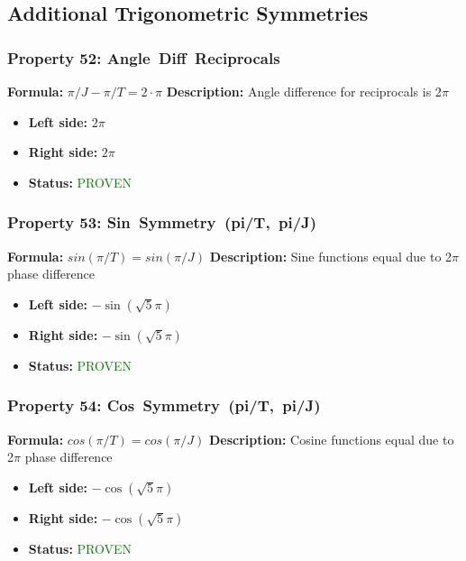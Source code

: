 \subsection{Additional Trigonometric Symmetries}

\subsubsection*{Property 52: Angle~Diff~Reciprocals}
\textbf{Formula:} $\pi/J - \pi/T = 2 \cdot \pi$
\textbf{Description:} Angle difference for reciprocals is 2$\pi$

\begin{itemize}
\item \textbf{Left side:} $2 \pi$
\item \textbf{Right side:} $2 \pi$
\item \textbf{Status:} \textcolor{green}{PROVEN}
\end{itemize}

\subsubsection*{Property 53: Sin~Symmetry~(pi/T,~pi/J)}
\textbf{Formula:} $sin(\pi/T) = sin(\pi/J)$
\textbf{Description:} Sine functions equal due to 2$\pi$ phase difference

\begin{itemize}
\item \textbf{Left side:} $- \sin{\left(\sqrt{5} \pi \right)}$
\item \textbf{Right side:} $- \sin{\left(\sqrt{5} \pi \right)}$
\item \textbf{Status:} \textcolor{green}{PROVEN}
\end{itemize}

\subsubsection*{Property 54: Cos~Symmetry~(pi/T,~pi/J)}
\textbf{Formula:} $cos(\pi/T) = cos(\pi/J)$
\textbf{Description:} Cosine functions equal due to 2$\pi$ phase difference

\begin{itemize}
\item \textbf{Left side:} $- \cos{\left(\sqrt{5} \pi \right)}$
\item \textbf{Right side:} $- \cos{\left(\sqrt{5} \pi \right)}$
\item \textbf{Status:} \textcolor{green}{PROVEN}
\end{itemize}

